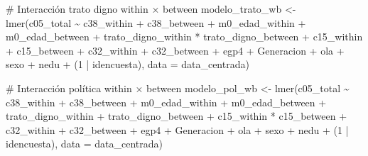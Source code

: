 \documentclass[
  spanish,
  a4paper,
  oneside]{scrbook}
\newenvironment{Shaded}{\begin{snugshade}}{\end{snugshade}}
\newcommand{\AttributeTok}[1]{\textcolor[rgb]{0.40,0.45,0.13}{#1}}
\newcommand{\CommentTok}[1]{\textcolor[rgb]{0.37,0.37,0.37}{#1}}
\newcommand{\DecValTok}[1]{\textcolor[rgb]{0.68,0.00,0.00}{#1}}
\newcommand{\FunctionTok}[1]{\textcolor[rgb]{0.28,0.35,0.67}{#1}}
\newcommand{\NormalTok}[1]{\textcolor[rgb]{0.00,0.23,0.31}{#1}}
\newcommand{\OtherTok}[1]{\textcolor[rgb]{0.00,0.23,0.31}{#1}}
\newcommand{\SpecialCharTok}[1]{\textcolor[rgb]{0.37,0.37,0.37}{#1}}
\begin{document}
\begin{Shaded}
\begin{Highlighting}[]
\CommentTok{\# Interacción trato digno within × between}
\NormalTok{modelo\_trato\_wb }\OtherTok{\textless{}{-}} \FunctionTok{lmer}\NormalTok{(c05\_total }\SpecialCharTok{\textasciitilde{}} 
\NormalTok{                          c38\_within }\SpecialCharTok{+}\NormalTok{ c38\_between }\SpecialCharTok{+}
\NormalTok{                          m0\_edad\_within }\SpecialCharTok{+}\NormalTok{ m0\_edad\_between }\SpecialCharTok{+}
\NormalTok{                          trato\_digno\_within }\SpecialCharTok{*}\NormalTok{ trato\_digno\_between }\SpecialCharTok{+}
\NormalTok{                          c15\_within }\SpecialCharTok{+}\NormalTok{ c15\_between }\SpecialCharTok{+}
\NormalTok{                          c32\_within }\SpecialCharTok{+}\NormalTok{ c32\_between }\SpecialCharTok{+}
\NormalTok{                          egp4 }\SpecialCharTok{+}\NormalTok{ Generacion }\SpecialCharTok{+}\NormalTok{ ola }\SpecialCharTok{+}\NormalTok{ sexo }\SpecialCharTok{+}\NormalTok{ nedu }\SpecialCharTok{+}
\NormalTok{                          (}\DecValTok{1} \SpecialCharTok{|}\NormalTok{ idencuesta), }\AttributeTok{data =}\NormalTok{ data\_centrada)}

\CommentTok{\# Interacción política within × between}
\NormalTok{modelo\_pol\_wb }\OtherTok{\textless{}{-}} \FunctionTok{lmer}\NormalTok{(c05\_total }\SpecialCharTok{\textasciitilde{}} 
\NormalTok{                        c38\_within }\SpecialCharTok{+}\NormalTok{ c38\_between }\SpecialCharTok{+}
\NormalTok{                        m0\_edad\_within }\SpecialCharTok{+}\NormalTok{ m0\_edad\_between }\SpecialCharTok{+}
\NormalTok{                        trato\_digno\_within }\SpecialCharTok{+}\NormalTok{ trato\_digno\_between }\SpecialCharTok{+}
\NormalTok{                        c15\_within }\SpecialCharTok{*}\NormalTok{ c15\_between }\SpecialCharTok{+}
\NormalTok{                        c32\_within }\SpecialCharTok{+}\NormalTok{ c32\_between }\SpecialCharTok{+}
\NormalTok{                        egp4 }\SpecialCharTok{+}\NormalTok{ Generacion }\SpecialCharTok{+}\NormalTok{ ola }\SpecialCharTok{+}\NormalTok{ sexo }\SpecialCharTok{+}\NormalTok{ nedu }\SpecialCharTok{+}
\NormalTok{                        (}\DecValTok{1} \SpecialCharTok{|}\NormalTok{ idencuesta), }\AttributeTok{data =}\NormalTok{ data\_centrada)}


\end{Highlighting}
\end{Shaded}
\end{document}
